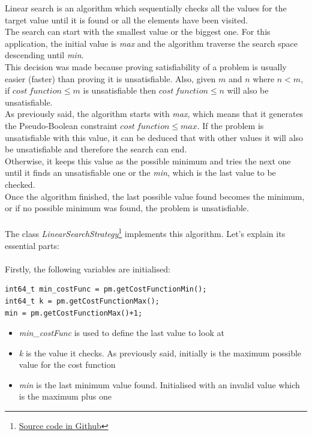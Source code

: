 Linear search is an algorithm which sequentially checks all the values for the target value until it is found or all the elements have been visited.\\
The search can start with the smallest value or the biggest one. For this application, the initial value is \emph{max} and the algorithm traverse the search space descending until \emph{min}.\\
This decision was made because proving satisfiability of a problem is usually easier (faster) than proving it is unsatisfiable. Also, given $m$ and $n$ where $n < m$, if $cost \ function \leq m$ is unsatisfiable then $cost \ function \leq n$ will also be unsatisfiable. \\
As previously said, the algorithm starts with \emph{max}, which means that it generates the Pseudo-Boolean constraint $cost \ function \leq max$. If the problem is unsatisfiable with this value, it can be deduced that with other values it will also be unsatisfiable and therefore the search can end.\\
Otherwise, it keeps this value as the possible minimum and tries the next one until it finds an unsatisfiable one or the \emph{min}, which is the last value to be checked.\\
Once the algorithm finished, the last possible value found becomes the minimum, or if no possible minimum was found, the problem is unsatisfiable.\\\\
The class \emph{LinearSearchStrategy}\footnote{\href{https://github.com/marcbenedi/SAT-tfg/blob/master/source_files/LinearSearchStrategy.cpp}{Source code in Github}} implements this algorithm. Let's explain its essential parts:\\\\
Firstly, the following variables are initialised:
\begin{verbatim}
int64_t min_costFunc = pm.getCostFunctionMin();
int64_t k = pm.getCostFunctionMax();
min = pm.getCostFunctionMax()+1;
\end{verbatim}
\begin{itemize}
	\item \emph{min\_costFunc} is used to define the last value to look at
	\item \emph{k} is the value it checks. As previously said, initially is the maximum possible value for the cost function
	\item \emph{min} is the last minimum value found. Initialised with an invalid value which is the maximum plus one
\end{itemize}

